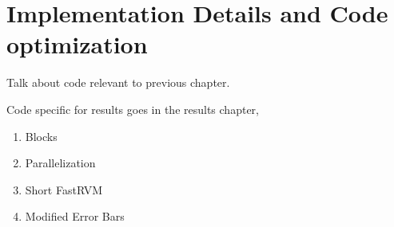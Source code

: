 \chapter{Implementation Details and Code optimization}
\label{ch:code}

Talk about code relevant to previous chapter.

Code specific for results goes in the results chapter,

\begin{enumerate}
\item Blocks
\item Parallelization
\item Short FastRVM
\item Modified Error Bars
\end{enumerate}
